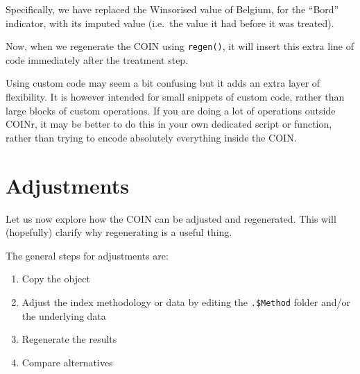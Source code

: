 \documentclass[
]{book}
\newenvironment{Shaded}{\begin{snugshade}}{\end{snugshade}}
\newcommand{\AlertTok}[1]{\textcolor[rgb]{0.94,0.16,0.16}{#1}}
\newcommand{\CommentTok}[1]{\textcolor[rgb]{0.56,0.35,0.01}{\textit{#1}}}
\newcommand{\DataTypeTok}[1]{\textcolor[rgb]{0.13,0.29,0.53}{#1}}
\newcommand{\KeywordTok}[1]{\textcolor[rgb]{0.13,0.29,0.53}{\textbf{#1}}}
\newcommand{\NormalTok}[1]{#1}
\newcommand{\OperatorTok}[1]{\textcolor[rgb]{0.81,0.36,0.00}{\textbf{#1}}}
\newcommand{\StringTok}[1]{\textcolor[rgb]{0.31,0.60,0.02}{#1}}
\providecommand{\tightlist}{%
  \setlength{\itemsep}{0pt}\setlength{\parskip}{0pt}}
\begin{document}
\begin{Shaded}
\end{Shaded}

Specifically, we have replaced the Winsorised value of Belgium, for the ``Bord'' indicator, with its imputed value (i.e.~the value it had before it was treated).

Now, when we regenerate the COIN using \texttt{regen()}, it will insert this extra line of code immediately after the treatment step.

Using custom code may seem a bit confusing but it adds an extra layer of flexibility. It is however intended for small snippets of custom code, rather than large blocks of custom operations. If you are doing a lot of operations outside COINr, it may be better to do this in your own dedicated script or function, rather than trying to encode absolutely everything inside the COIN.

\hypertarget{adjustments}{%
\section{Adjustments}\label{adjustments}}

Let us now explore how the COIN can be adjusted and regenerated. This will (hopefully) clarify why regenerating is a useful thing.

The general steps for adjustments are:

\begin{enumerate}
\def\labelenumi{\arabic{enumi}.}
\tightlist
\item
  Copy the object
\item
  Adjust the index methodology or data by editing the \texttt{.\$Method} folder and/or the underlying data
\item
  Regenerate the results
\item
  Compare alternatives
\end{enumerate}
\end{document}
